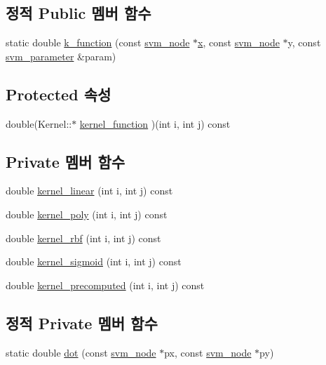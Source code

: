 \subsection*{정적 Public 멤버 함수}
\begin{DoxyCompactItemize}
\item 
static double \hyperlink{class_kernel_a6ff0d4ac64bf7fba29d2ca3433dd5127}{k\+\_\+function} (const \hyperlink{structsvm__node}{svm\+\_\+node} $\ast$\hyperlink{class_kernel_a725a35660c4309605c2628fa8290ce5f}{x}, const \hyperlink{structsvm__node}{svm\+\_\+node} $\ast$y, const \hyperlink{structsvm__parameter}{svm\+\_\+parameter} \&param)
\end{DoxyCompactItemize}
\subsection*{Protected 속성}
\begin{DoxyCompactItemize}
\item 
double(Kernel\+::$\ast$ \hyperlink{class_kernel_a575eeb588e8a5c62ff3228a35e255a02}{kernel\+\_\+function} )(int i, int j) const 
\end{DoxyCompactItemize}
\subsection*{Private 멤버 함수}
\begin{DoxyCompactItemize}
\item 
double \hyperlink{class_kernel_a9ccd52d8f291ab38be66944257420a87}{kernel\+\_\+linear} (int i, int j) const 
\item 
double \hyperlink{class_kernel_af9a74728d70af7ec68947b1e443a5dc5}{kernel\+\_\+poly} (int i, int j) const 
\item 
double \hyperlink{class_kernel_a78f1025eae410c560c8e55845b2fcb3f}{kernel\+\_\+rbf} (int i, int j) const 
\item 
double \hyperlink{class_kernel_a16d668579ecb347c4188f8772ca00547}{kernel\+\_\+sigmoid} (int i, int j) const 
\item 
double \hyperlink{class_kernel_aa7bce181dce4b32b1d84b0483006d934}{kernel\+\_\+precomputed} (int i, int j) const 
\end{DoxyCompactItemize}
\subsection*{정적 Private 멤버 함수}
\begin{DoxyCompactItemize}
\item 
static double \hyperlink{class_kernel_af258ecfb8ca0182e6a79c06291586e5b}{dot} (const \hyperlink{structsvm__node}{svm\+\_\+node} $\ast$px, const \hyperlink{structsvm__node}{svm\+\_\+node} $\ast$py)
\end{DoxyCompactItemize}
